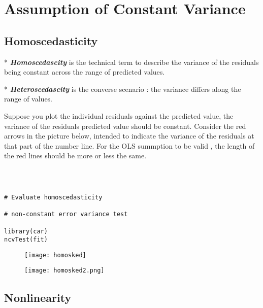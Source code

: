 \documentclass[residuals.tex]{subfiles}
\begin{document}
\section{Assumption of Constant Variance}
\subsection*{Homoscedasticity}
\begin{itemize}
*  \textbf{\textit{Homoscedascity}} is the technical term to describe the variance of the residuals being constant across the range of predicted values. 

*  \textbf{\textit{Heteroscedascity}} is the converse scenario : the variance differs along the range of values.
\end{itemize}


\noindent Suppose you plot the individual residuals against the predicted value, the variance of the residuals predicted value should be constant. 
\bigskip
\noindent Consider the red arrows in the picture below, intended to indicate the variance of the residuals at that part of the number line. For the OLS summption to be valid , the length of the red lines should be more or less the same.


\begin{framed}

\begin{verbatim}	



# Evaluate homoscedasticity

# non-constant error variance test

library(car)
ncvTest(fit)
\end{verbatim}
\end{framed}


\begin{figure}[h!]
\centering
\texttt{[image: homosked]}
\caption{}
\label{fig:homosked}
\end{figure}



\begin{figure}[h!]
\centering
\texttt{[image: homosked2.png]}
\caption{}
\label{fig:homosked2}
\end{figure}



\subsection{Nonlinearity}
\end{document}
